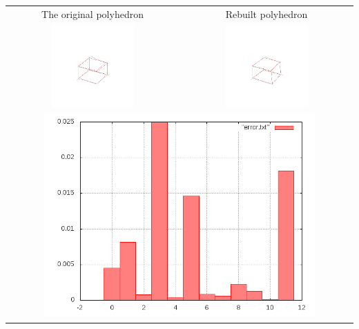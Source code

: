 \documentclass[11pt,fleqn,a4paper]{scrartcl}
\begin{document}
\begin{center}
\begin{tabular}{|c|c|}
\hline
\end{tabular}
\end{center}

\begin{center}

\begin{tabular}{|c|c|}
\hline
The original polyhedron& Rebuilt polyhedron \\
\includegraphics[width=0.5\textwidth]{variant2/images/2/input.png} &
\includegraphics[width=0.5\textwidth]{variant2/images/2/out.png} \\
\midrule
\multicolumn{2}{|c|}{ \includegraphics[width=0.8\textwidth]{variant2/images/2/error.png}} \\
\hline
\end{tabular}
\end{center}
\end{document}
